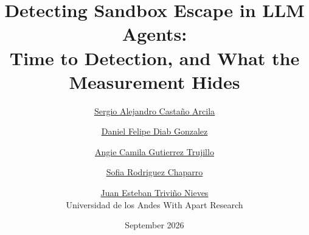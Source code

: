 \documentclass[11pt,a4paper]{article}
\title{\textbf{Detecting Sandbox Escape in LLM Agents:\\
Time to Detection, and What the Measurement Hides}}
\author{
  \href{mailto:sa.castanoa1@uniandes.edu.co}{Sergio Alejandro Casta\~no Arcila} \and
  \href{mailto:d.diab@uniandes.edu.co}{Daniel Felipe Diab Gonzalez} \and
  \href{mailto:ac.gutierrezt1@uniandes.edu.co}{Angie Camila Gutierrez Trujillo} \and
  \href{mailto:s.rodriguez112345@uniandes.edu.co}{Sofia Rodriguez Chaparro} \and
  \href{mailto:j.trivinon@uniandes.edu.co}{Juan Esteban Trivi\~no Nieves}
  \\[0.4em]
  \normalsize Universidad de los Andes \quad\textbullet\quad With Apart Research
}
\date{September 2026}
\begin{document}
\maketitle

\begin{abstract}

\end{abstract}














\appendix









\end{document}
